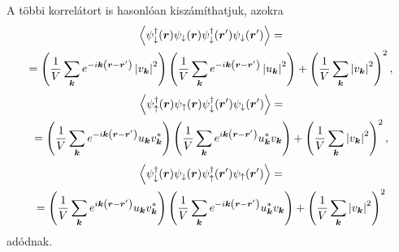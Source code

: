 \documentclass[a4paper,12pt,titlepage]{article}
\newcommand{\KK}{{\vb*{k}}}
\newcommand{\RR}{{\vb*{r}}}
\begin{document}
A többi korrelátort is hasonlóan kiszámíthatjuk, azokra
\begin{multline}
	\left< \psi_\downarrow^\dagger(\RR) \psi_\downarrow(\RR) \psi_\downarrow^\dagger(\RR^\prime) \psi_\downarrow(\RR^\prime) \right> = \\
	= \left( \frac{1}{V} \sum\limits_\KK e^{-i \KK \left( \RR - \RR^\prime \right)} \left| v_\KK \right|^2 \right) \left( \frac{1}{V} \sum\limits_\KK e^{-i \KK \left( \RR - \RR^\prime \right)} \left| u_\KK \right|^2 \right) + \left( \frac{1}{V} \sum\limits_\KK \left| v_\KK \right|^2 \right)^2,
\end{multline}
\begin{multline}
	\left< \psi_\uparrow^\dagger(\RR) \psi_\uparrow(\RR) \psi_\downarrow^\dagger(\RR^\prime) \psi_\downarrow(\RR^\prime) \right> = \\
	= \left( \frac{1}{V} \sum\limits_\KK e^{-i \KK \left( \RR - \RR^\prime \right)} u_\KK v_\KK^* \right) \left( \frac{1}{V} \sum\limits_\KK e^{i \KK \left( \RR - \RR^\prime \right)} u_\KK^* v_\KK \right) + \left( \frac{1}{V} \sum\limits_\KK \left| v_\KK \right|^2 \right)^2,
\end{multline}
\begin{multline}
	\left< \psi_\downarrow^\dagger(\RR) \psi_\downarrow(\RR) \psi_\uparrow^\dagger(\RR^\prime) \psi_\uparrow(\RR^\prime) \right> = \\
	= \left( \frac{1}{V} \sum\limits_\KK e^{i \KK \left( \RR - \RR^\prime \right)} u_\KK v_\KK^* \right) \left( \frac{1}{V} \sum\limits_\KK e^{-i \KK \left( \RR - \RR^\prime \right)} u_\KK^* v_\KK \right) + \left( \frac{1}{V} \sum\limits_\KK \left| v_\KK \right|^2 \right)^2
\end{multline}
adódnak.
\end{document}

